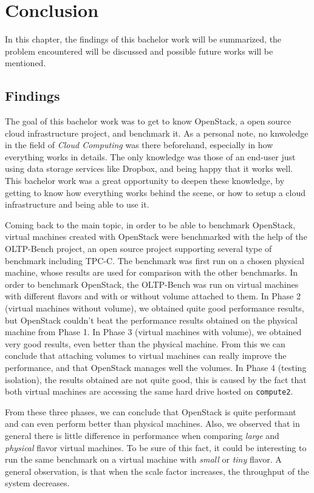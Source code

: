 

\chapter{Conclusion}
In this chapter, the findings of this bachelor work will be summarized, the problem encountered will be discussed and possible future works will be mentioned.


\section{Findings}
The goal of this bachelor work was to get to know OpenStack, a open source cloud infrastructure project, and benchmark it.
As a personal note, no knwoledge in the field of \textit{Cloud Computing} was there beforehand, especially in how everything works in details.
The only knowledge was those of an end-user just using data storage services like Dropbox, and being happy that it works well.
This bachelor work was a great opportunity to deepen these knowledge, by getting to know how everything works behind the scene, or how to setup a cloud infrastructure and being able to use it.

Coming back to the main topic, in order to be able to benchmark OpenStack, virtual machines created with OpenStack were benchmarked with the help of the OLTP-Bench project, an open source project supporting several type of benchmark including TPC-C.
The benchmark was first run on a chosen physical machine, whose results are used for comparison with the other benchmarks.
In order to benchmark OpenStack, the OLTP-Bench was run on virtual machines with different flavors and with or without volume attached to them.
In Phase 2 (virtual machines without volume), we obtained quite good performance results, but OpenStack couldn't beat the performance results obtained on the physical machine from Phase 1.
In Phase 3 (virtual machines with volume), we obtained very good results, even better than the physical machine.
From this we can conclude that attaching volumes to virtual machines can really improve the performance, and that OpenStack manages well the volumes.
In Phase 4 (testing isolation), the results obtained are not quite good, this is caused by the fact that both virtual machines are accessing the same hard drive hosted on \texttt{compute2}.

From these three phases, we can conclude that OpenStack is quite performant and can even perform better than physical machines.
Also, we observed that in general there is little difference in performance when comparing \textit{large} and \textit{physical} flavor virtual machines.
To be sure of this fact, it could be interesting to run the same benchmark on a virtual machine with \textit{small} or \textit{tiny} flavor.
A general observation, is that when the scale factor increases, the throughput of the system decreases.

